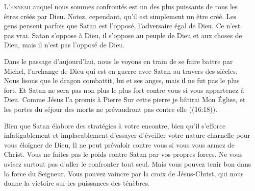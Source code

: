 


\lettrine{L}{'ennemi} auquel nous sommes confrontés est un des plus puissants
 de tous les êtres créés par Dieu. Notez, cependant, qu'il est simplement
 un être créé. Les gens pensent parfois que Satan est l'opposé,
 l'adversaire égal de Dieu. Ce n'est pas vrai. Satan s'oppose à Dieu,
 il s'oppose au peuple de Dieu et aux choses de Dieu,
 mais il n'est pas l'opposé de Dieu.


Dans le passage d'aujourd'hui, nous le voyons en train de se faire battre
 par Michel, l'archange de Dieu qui est en guerre avec Satan
 au travers des siècles. Nous lisons que 
 \Og le dragon combattit, lui et ses anges,
 mais il ne fut pas le plus fort. \Fg{}
 Et Satan ne sera pas non plus le plus fort contre vous
 si vous appartenez à Dieu. Comme Jésus l'a promis à Pierre\frcolon{} 
 \Og Sur cette pierre je bâtirai Mon Église, et les portes du séjour
 des morts ne prévaudront pas contre elle \Fg{} ((16:18)).

Bien que Satan élabore des stratégies à votre encontre,
 bien qu'il s'efforce infatigablement et implacablement d'essayer d'éveiller
 votre nature charnelle pour vous éloigner de Dieu, Il ne peut prévaloir
 contre vous si vous vous armez de Christ.
 Vous ne faites pas le poids contre Satan par vos propres forces.
 Ne vous avisez surtout pas d'aller le confronter tout seul.
 Mais vous pouvez tenir bon dans la force du Seigneur.
 Vous pouvez vaincre par la croix de Jésus-Christ,
 qui nous donne la victoire sur les puissances des ténèbres.

\dvrule





